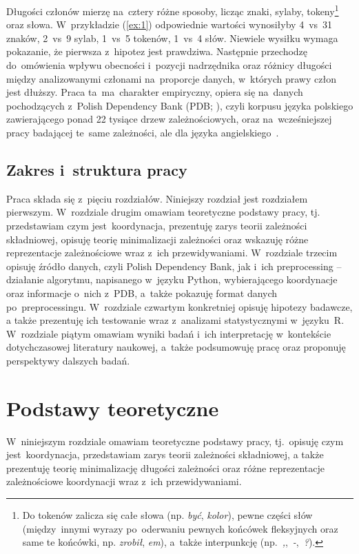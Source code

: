 \documentclass[licencjacka]{pracamgr_Kogni}
\begin{document}
    Długości członów mierzę na~cztery różne sposoby, licząc znaki, sylaby, tokeny\footnote{Do tokenów zalicza się całe słowa (np. \textit{być}, \textit{kolor}), pewne części słów (między~innymi wyrazy po~oderwaniu pewnych końcówek fleksyjnych oraz same te końcówki, np. \textit{zrobił}, \textit{em}), a~także interpunkcję (np.~\textit{,},~\textit{-},~\textit{?}).} oraz słowa.
    W~przykładzie (\ref{ex:1}) odpowiednie wartości wynosiłyby 4~vs~31 znaków, 2~vs~9 sylab, 1~vs~5 tokenów, 1~vs~4 słów.
    Niewiele wysiłku wymaga pokazanie, że pierwsza z~hipotez jest prawdziwa.
    Następnie przechodzę do~omówienia wpływu obecności i~pozycji nadrzędnika oraz różnicy długości między analizowanymi członami na~proporcje danych, w~których prawy człon jest dłuższy.
    Praca ta~ma~charakter empiryczny, opiera się na~danych pochodzących z~Polish Dependency Bank (PDB; \citealp{Wroblewska2014}), czyli korpusu języka polskiego zawierającego ponad 22 tysiące drzew zależnościowych, oraz na~wcześniejszej pracy badającej te~same zależności, ale dla języka angielskiego~\citep{Przepiorkowski2023}.


    \section{Zakres i~struktura pracy}\label{sec:zakres-istruktura-pracy}
    Praca składa się z~pięciu rozdziałów. 
    Niniejszy rozdział jest rozdziałem pierwszym.
    W~rozdziale drugim omawiam teoretyczne podstawy pracy, tj. przedstawiam czym jest~koordynacja, prezentuję zarys teorii zależności składniowej, opisuję teorię minimalizacji zależności oraz wskazuję różne reprezentacje zależnościowe wraz z~ich przewidywaniami.
    W~rozdziale trzecim opisuję źródło danych, czyli Polish Dependency Bank, jak i~ich preprocessing -- działanie algorytmu, napisanego w~języku Python, wybierającego koordynacje oraz informacje o~nich z~PDB, a~także pokazuję format danych po~preprocessingu.
    W~rozdziale czwartym konkretniej opisuję hipotezy badawcze, a także prezentuję ich testowanie wraz z~analizami statystycznymi w~języku~R. W~rozdziale piątym omawiam wyniki badań i~ich interpretację w~kontekście dotychczasowej literatury naukowej, a~także podsumowuję pracę oraz proponuję perspektywy dalszych badań.


    \chapter{Podstawy teoretyczne}\label{ch:podstawy-teoretyczne}
    W~niniejszym rozdziale omawiam teoretyczne podstawy pracy, tj.~opisuję czym jest~koordynacja, przedstawiam zarys teorii zależności składniowej, a także prezentuję teorię minimalizację długości zależności oraz różne reprezentacje zależnościowe koordynacji wraz z~ich przewidywaniami.
\end{document}
